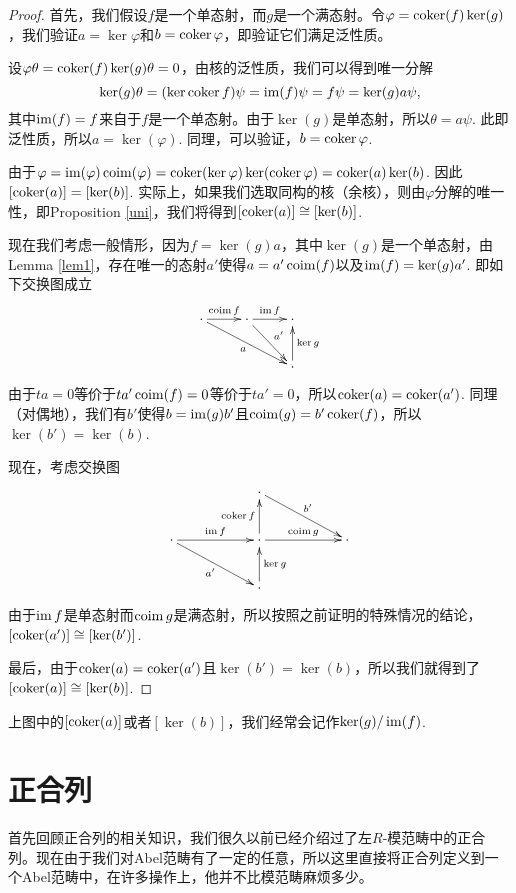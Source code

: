 \begin{proof}
首先，我们假设$f$是一个单态射，而$g$是一个满态射。令$\varphi=\operatorname{coker} (f) \ker (g)$，我们验证$a=\ker \varphi$和$b=\operatorname{coker} \varphi$，即验证它们满足泛性质。

设$\varphi \theta=\operatorname{coker} (f)\ker(g)\theta=0$，由核的泛性质，我们可以得到唯一分解
\[
	\ker(g)\theta=(\ker \operatorname{coker} f)\psi=\operatorname{im}(f)\psi=f\psi=\ker(g)a\psi,
\]
其中$\operatorname{im}(f)=f$来自于$f$是一个单态射。由于$\ker(g)$是单态射，所以$\theta=a\psi$. 此即泛性质，所以$a=\ker(\varphi)$. 同理，可以验证，$b=\operatorname{coker} \varphi$.

由于$\varphi=\operatorname{im}(\varphi)\operatorname{coim}(\varphi)=\operatorname{coker}(\ker \varphi)\ker(\operatorname{coker} \varphi)=\operatorname{coker}(a)\ker(b)$. 因此$[\operatorname{coker}(a)]=[\ker(b)]$. 实际上，如果我们选取同构的核（余核），则由$\varphi$分解的唯一性，即Proposition \ref{uni}，我们将得到$[\operatorname{coker}(a)]\cong [\ker(b)]$.

现在我们考虑一般情形，因为$f=\ker(g)a$，其中$\ker(g)$是一个单态射，由Lemma \ref{lem1}，存在唯一的态射$a'$使得$a=a'\operatorname{coim}(f)$以及$\operatorname{im}(f)=\ker(g)a'$. 即如下交换图成立
\[
\begin{xy}
	\xymatrix{
	\cdot \ar[r]^{\coim f} \ar[rrd]_a&\cdot \ar[r]^{\im f} \ar[rd]^{a'}&\cdot \\
	&&\cdot \ar[u]_{\ker g}
	}
\end{xy}
\]
由于$ta=0$等价于$ta'\operatorname{coim}(f)=0$等价于$ta'=0$，所以$\operatorname{coker}(a)=\operatorname{coker}(a')$. 同理（对偶地），我们有$b'$使得$b=\operatorname{im}(g)b'$且$\operatorname{coim}(g)=b' \operatorname{coker}(f)$，所以$\ker(b')=\ker(b)$.

现在，考虑交换图
\[
\begin{xy}
	\xymatrix{
	&&\cdot \ar[rrd]^{b'}&&\\
	\cdot \ar[rr]^{\im f} \ar[rrd]_{a'}&&\cdot \ar[rr]^{\coim g}\ar[u]^{\coker f}&&\cdot\\
	&&\cdot \ar[u]_{\ker g}&&
	}
\end{xy}
\]
由于$\operatorname{im} f$是单态射而$\operatorname{coim} g$是满态射，所以按照之前证明的特殊情况的结论，$[\operatorname{coker}(a')]\cong [\ker(b')]$. 

最后，由于$\operatorname{coker}(a)=\operatorname{coker}(a')$且$\ker(b')=\ker(b)$，所以我们就得到了$[\operatorname{coker}(a)]\cong [\ker(b)]$.
\end{proof}

上图中的$[\operatorname{coker}(a)]$或者$[\ker(b)]$，我们经常会记作$\ker(g)/\operatorname{im}(f)$.

\section{正合列}

首先回顾正合列的相关知识，我们很久以前已经介绍过了左$R$-模范畴中的正合列。现在由于我们对Abel范畴有了一定的任意，所以这里直接将正合列定义到一个Abel范畴中，在许多操作上，他并不比模范畴麻烦多少。

